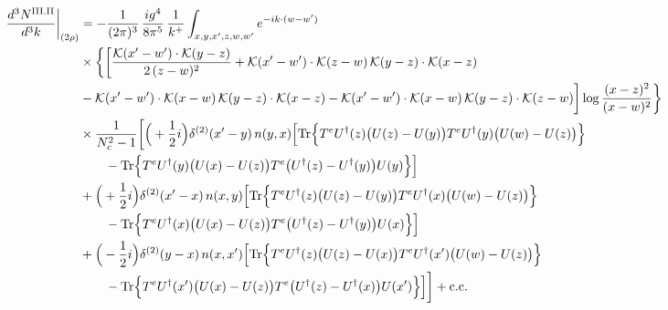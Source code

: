 \documentclass[9pt]{article}
\numberwithin{equation}{section}
\begin{document}
\begin{align}
\frac{d^{3}N^{\rm III.II}}{d^{3}k}\bigg|_{(2\rho)}&=-\frac{1}{(2\pi)^{3}}\,\frac{ig^{4}}{8\pi^{5}}\,\frac{1}{k^{+}}\int_{x,y,x',z,w,w'}e^{-ik\cdot(w-w')}\notag\\
&\times\bigg\{\bigg[\frac{\mathcal{K}(x'-w')\cdot\mathcal{K}(y-z)}{2\,(z-w)^{2}}+\mathcal{K}(x'-w')\cdot\mathcal{K}(z-w)\,\mathcal{K}(y-z)\cdot\mathcal{K}(x-z)\notag\\
&-\mathcal{K}(x'-w')\cdot\mathcal{K}(x-w)\,\mathcal{K}(y-z)\cdot\mathcal{K}(x-z)-\mathcal{K}(x'-w')\cdot\mathcal{K}(x-w)\,\mathcal{K}(y-z)\cdot\mathcal{K}(z-w)\bigg]\log\frac{(x-z)^{2}}{(x-w)^{2}}\bigg\}\notag\\
&\times \frac{1}{N_{c}^{2}-1}\bigg[\Big(+\frac{1}{2}i\Big)\delta^{(2)}(x'-y)\,n(y,x)\Big[{\rm Tr}\Big\{T^{e}U^{\dagger}(z)\big(U(z)-U(y)\big)T^{e}U^{\dagger}(y)\big(U(w)-U(z)\big)\Big\}\notag\\&\qquad-{\rm Tr}\Big\{T^{e}U^{\dagger}(y)\big(U(x)-U(z)\big)T^{e}\big(U^{\dagger}(z)-U^{\dagger}(y)\big)U(y)\Big\}\Big]\notag\\
& +\Big(+\frac{1}{2}i\Big)\delta^{(2)}(x'-x)\,n(x,y)\Big[{\rm Tr}\Big\{T^{e}U^{\dagger}(z)\big(U(z)-U(y)\big)T^{e}U^{\dagger}(x)\big(U(w)-U(z)\big)\Big\}\notag\\&\qquad-{\rm Tr}\Big\{T^{e}U^{\dagger}(x)\big(U(x)-U(z)\big)T^{e}\big(U^{\dagger}(z)-U^{\dagger}(y)\big)U(x)\Big\}\Big]\notag\\
& +\Big(-\frac{1}{2}i\Big)\delta^{(2)}(y-x)\,n(x,x')\Big[{\rm Tr}\Big\{T^{e}U^{\dagger}(z)\big(U(z)-U(x)\big)T^{e}U^{\dagger}(x')\big(U(w)-U(z)\big)\Big\}\notag\\&\qquad-{\rm Tr}\Big\{T^{e}U^{\dagger}(x')\big(U(x)-U(z)\big)T^{e}\big(U^{\dagger}(z)-U^{\dagger}(x)\big)U(x')\Big\}\Big]\bigg]+{\rm c.c.}\label{eq:S-III.II-2}
\end{align}
\end{document}
